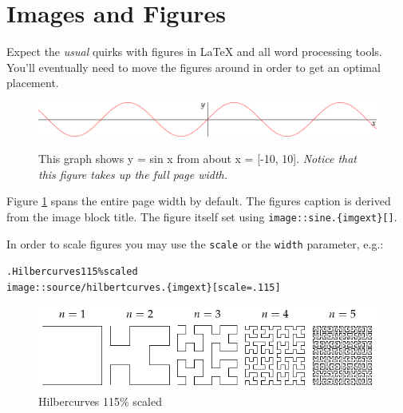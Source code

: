 \documentclass[10pt,a4paper,oneside,BCOR5mm]{scrartcl}
\begin{document}
\section{Images and Figures}
\label{_images_and_figures}
 \par\noindent{}
Expect the \emph{usual} quirks with figures in \LaTeX{} and all word processing tools. You'll eventually need to move the figures around in order to get an optimal placement.
\begin{figure}[!htbp]
\begin{center}
\hypertarget{figsine}{}
\includegraphics[scale=.8,]{source/sine.pdf}%
\label{figsine}
\caption{This graph shows y = sin x from about x = [-10, 10]. \emph{Notice that this figure takes up the full page width.}}
\end{center}
\end{figure}
 \par\noindent{}Figure \hyperlink{figsine}{1} spans the entire page width by default. The figures caption is derived from the image block title. The figure itself set using \texttt{image::sine.\{{}imgext\}{}[]}.
 \par\noindent{}In order to scale figures you may use the \texttt{scale}  or the \texttt{width} parameter, e.g.:
\begin{alltt}.Hilbercurves 115\%{} scaled
image::source/hilbertcurves.\{{}imgext\}{}[scale=\textquotedbl{}.115\textquotedbl{}]\end{alltt}
 \par\noindent{}
\begin{figure}[!htbp]
\begin{center}
\includegraphics[scale=1.15,]{source/hilbertcurves.pdf}%
\caption{Hilbercurves 115\%{} scaled}
\end{center}
\end{figure}
\hypertarget{_code_listings}{}
\end{document}
